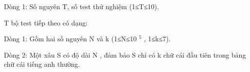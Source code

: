 Dòng 1: Số nguyên T, số test thử nghiệm (1≤T≤10).  

   T bộ test tiếp theo có dạng:  

   Dòng 1: Gồm hai số nguyên N và k (1≤N≤10   $^    5   $   , 1≤k≤7).  

   Dòng 2: Một xâu S có độ dài N , đảm bảo S chỉ có k chữ cái đầu tiên trong bảng chữ cái tiếng anh thường.